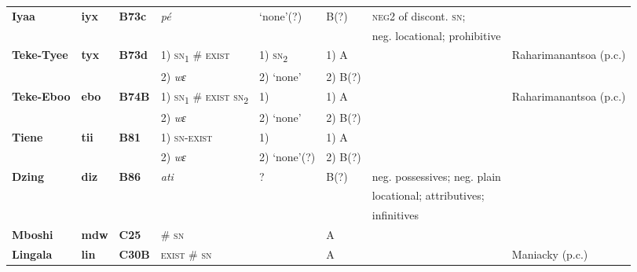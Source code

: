 \documentclass[output=paper]{langsci/langscibook}
\begin{document}
\begin{sidewaystable}[p]%
\begin{scriptsize}
\begin{tabularx}{\textwidth}{llllllll}
\lsptoprule
\textbf{Iyaa} 	&\textbf{iyx} 	&\textbf{B73c} 	&\textit{p\'e}		&`none'(?) 								&B(?) 	&\textsc{neg}2 of discont. \textsc{sn};						&\citet{Mouandza2001}\\
				&				&				&				&										&		&neg. locational; prohibitive						&\\\midrule
\textbf{Teke-Tyee}&\textbf{tyx}	&\textbf{B73d}	&1) \textsc{sn}\textsubscript{1} \# \textsc{exist}%
																&1) \textendash \textsc{sn}\textsubscript{2}%
																										&1) A{}	&												&Raharimanantsoa (p.c.)\\
				&				&				&2) \textit{wɛ}	&2) `none'								&2) B(?)	&												&\\\midrule
\textbf{Teke-Eboo}&\textbf{ebo} 	&\textbf{B74B}	&1) \textsc{sn}\textsubscript{1} \# \textsc{exist} \textsc{sn}\textsubscript{2}%
																&1) \textendash							&1) A{}	&												&Raharimanantsoa (p.c.)\\
				&				&				&2) \textit{wɛ}	&2) `none'								&2) B(?)	&												&\\\midrule
\textbf{Tiene} 	&\textbf{tii} 		&\textbf{B81} 	&1) \textsc{sn-exist}&1) \textendash						&1) A{}	&												&\citet{Ellington1977}\\
				&				&				&2) \textit{wɛ} 	&2) `none'(?)							&2) B(?)\\\midrule
\textbf{Dzing} 	&\textbf{diz} 	&\textbf{B86} 	&\textit{ati} 		&? 										& B(?) 	& neg. possessives; neg. plain						&\citet{Mertens1938}\\
				&				&				&				&										&		&locational; attributives;\\
				&				&				&				&										&		&infinitives\\\midrule
\textbf{Mboshi} 	&\textbf{mdw} 	&\textbf{C25} 	&\# \textsc{sn}	& 										&A 		&  												&\citet{Amboulou1998}\\\midrule
\textbf{Lingala} 	&\textbf{lin}		&\textbf{C30B} 	&\textsc{exist} \# \textsc{sn}&\textendash					&A{}	&												&Maniacky (p.c.)\\\midrule

\end{tabularx}
\end{scriptsize}
\end{sidewaystable}
\end{document}
